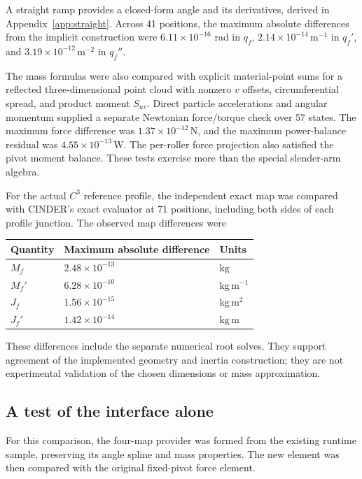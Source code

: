 \documentclass[11pt,letterpaper]{article}
\numberwithin{equation}{section}
\begin{document}
A straight ramp provides a closed-form angle and its derivatives, derived in Appendix~\ref{app:straight}. Across 41 positions, the maximum absolute differences from the implicit construction were $6.11\times10^{-16}$ rad in $q_f$, $2.14\times10^{-14}\,\mathrm{m^{-1}}$ in $q_f'$, and $3.19\times10^{-12}\,\mathrm{m^{-2}}$ in $q_f''$.

The mass formulas were also compared with explicit material-point sums for a reflected three-dimensional point cloud with nonzero $v$ offsets, circumferential spread, and product moment $S_{uv}$. Direct particle accelerations and angular momentum supplied a separate Newtonian force/torque check over 57 states. The maximum force difference was $1.37\times10^{-12}\,\mathrm{N}$, and the maximum power-balance residual was $4.55\times10^{-13}\,\mathrm{W}$. The per-roller force projection also satisfied the pivot moment balance. These tests exercise more than the special slender-arm algebra.

For the actual $C^3$ reference profile, the independent exact map was compared with CINDER's exact evaluator at 71 positions, including both sides of each profile junction. The observed map differences were
\begin{center}
\begin{tabular}{@{}lll@{}}
\toprule
Quantity & Maximum absolute difference & Units\\
\midrule
$M_f$ & $2.48\times10^{-13}$ & $\mathrm{kg}$\\
$M_f'$ & $6.28\times10^{-10}$ & $\mathrm{kg\,m^{-1}}$\\
$J_f$ & $1.56\times10^{-15}$ & $\mathrm{kg\,m^2}$\\
$J_f'$ & $1.42\times10^{-14}$ & $\mathrm{kg\,m}$\\
\bottomrule
\end{tabular}
\end{center}
These differences include the separate numerical root solves. They support agreement of the implemented geometry and inertia construction; they are not experimental validation of the chosen dimensions or mass approximation.

\subsection{A test of the interface alone}

For this comparison, the four-map provider was formed from the existing runtime sample, preserving its angle spline and mass properties. The new element was then compared with the original fixed-pivot force element.
\end{document}

